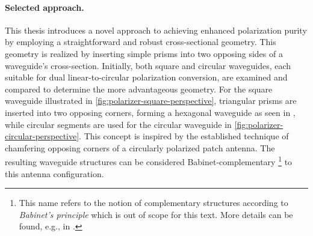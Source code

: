 \documentclass[11pt,a4paper,twoside,openany]{report}
\begin{document}
\paragraph{Selected approach.} This thesis introduces a novel approach to achieving enhanced polarization purity by employing a straightforward and robust cross-sectional geometry. This geometry is realized by inserting simple prisms into two opposing sides of a waveguide's cross-section. Initially, both square and circular waveguides, each suitable for dual linear-to-circular polarization conversion, are examined and compared to determine the more advantageous geometry. For the square waveguide illustrated in \cref{fig:polarizer-square-perspective}, triangular prisms are inserted into two opposing corners, forming a hexagonal waveguide as seen in \parencite{bhardwaj-volakis:hexagonal-waveguides-new-class-of-waveguides-for-mmwave-circularly-polarized-horns}, while circular segments are used for the circular waveguide in \cref{fig:polarizer-circular-perspective}. This concept is inspired by the established technique of chamfering opposing corners of a circularly polarized patch antenna. The resulting waveguide structures can be considered Babinet-complementary%
    \footnote{This name refers to the notion of complementary structures according to \emph{Babinet's principle} which is out of scope for this text. More details can be found, e.g., in \parencite{born-wolf:principles-of-optics}.}
to this antenna configuration.
\end{document}
